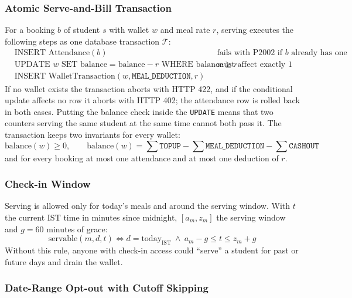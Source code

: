 \documentclass[11pt,a4paper]{article}
\begin{document}
\subsubsection{Atomic Serve-and-Bill Transaction}

For a booking $b$ of student $s$ with wallet $w$ and meal rate $r$, serving
executes the following steps as one database transaction $\mathcal{T}$:
\begin{align}
&\text{INSERT Attendance}(b) &&\text{fails with P2002 if } b \text{ already has one}\\
&\text{UPDATE } w \text{ SET balance} = \text{balance} - r \text{ WHERE balance} \geq r
  &&\text{must affect exactly 1 row}\\
&\text{INSERT WalletTransaction}(w, \texttt{MEAL\_DEDUCTION}, r)
\end{align}
If no wallet exists the transaction aborts with HTTP 422, and if the conditional
update affects no row it aborts with HTTP 402; the attendance row is rolled back
in both cases. Putting the balance check inside the \texttt{UPDATE} means that
two counters serving the same student at the same time cannot both pass it. The
transaction keeps two invariants for every wallet:
\begin{equation}
\text{balance}(w) \geq 0, \qquad
\text{balance}(w) = \sum \texttt{TOPUP} - \sum \texttt{MEAL\_DEDUCTION} - \sum \texttt{CASHOUT}
\end{equation}
and for every booking at most one attendance and at most one deduction of $r$.

\subsubsection{Check-in Window}

Serving is allowed only for today's meals and around the serving window. With
$t$ the current IST time in minutes since midnight, $[a_m, z_m]$ the serving
window and $g = 60$ minutes of grace:
\begin{equation}
\text{servable}(m, d, t) \iff d = \text{today}_{\text{IST}} \ \land\ a_m - g \leq t \leq z_m + g
\end{equation}
Without this rule, anyone with check-in access could ``serve'' a student for
past or future days and drain the wallet.

\subsubsection{Date-Range Opt-out with Cutoff Skipping}
\end{document}
